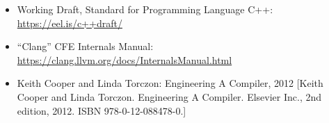 \begin{itemize}
\item
Working Draft, Standard for Programming Language C++: \url{https://eel.is/c++draft/}

\item
“Clang” CFE Internals Manual: \url{https://clang.llvm.org/docs/InternalsManual.html}

\item
Keith Cooper and Linda Torczon: Engineering A Compiler, 2012 [Keith Cooper and Linda Torczon. Engineering A Compiler. Elsevier Inc., 2nd edition, 2012. ISBN 978-0-12-088478-0.]
\end{itemize}